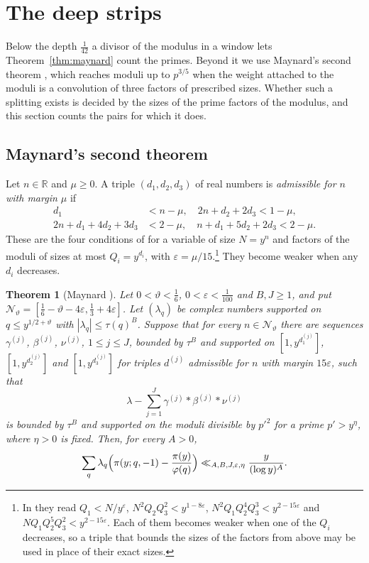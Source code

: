 \documentclass[aps,prd,twocolumn,superscriptaddress,nofootinbib,longbibliography,floatfix,showkeys,nobalancelastpage,amsmath,amssymb,10pt]{revtex4-2}
\theoremstyle{plain}
\newtheorem{theorem}{Theorem}[section]
\theoremstyle{definition}
\theoremstyle{plain}
\newcommand{\eps}{\varepsilon}
\begin{document}
\section{The deep strips}\label{sec:deep}

Below the depth $\frac1{42}$ a divisor of the modulus in a window lets Theorem~\ref{thm:maynard} count the primes. Beyond it we use Maynard's second theorem \cite{May2}, which reaches moduli up to $p^{3/5}$ when the weight attached to the moduli is a convolution of three factors of prescribed sizes. Whether such a splitting exists is decided by the sizes of the prime factors of the modulus, and this section counts the pairs for which it does.

\subsection{Maynard's second theorem}

Let $n\in\mathbb R$ and $\mu\ge0$. A triple $(d_1,d_2,d_3)$ of real numbers is \emph{admissible for $n$ with margin $\mu$} if
\begin{equation}\label{eq:adm}
\begin{split}
d_1&<n-\mu,\quad 2n+d_2+2d_3<1-\mu,\\
2n+d_1+4d_2+3d_3&<2-\mu,\quad n+d_1+5d_2+2d_3<2-\mu.
\end{split}
\end{equation}
These are the four conditions of \cite[Proposition~8.2]{May2} for a variable of size $N=y^n$ and factors of the moduli of sizes at most $Q_i=y^{d_i}$, with $\eps=\mu/15$.\footnote{In \cite{May2} they read $Q_1<N/y^{\eps}$, $N^2Q_2Q_3^2<y^{1-8\eps}$, $N^2Q_1Q_2^4Q_3^3<y^{2-15\eps}$ and $NQ_1Q_2^5Q_3^2<y^{2-15\eps}$. Each of them becomes weaker when one of the $Q_i$ decreases, so a triple that bounds the sizes of the factors from above may be used in place of their exact sizes.} They become weaker when any $d_i$ decreases.

\begin{theorem}[Maynard {\cite{May2}}]\label{thm:maynard2}
Let $0<\vartheta<\frac16$, $0<\eps<\frac1{100}$ and $B,J\ge1$, and put $\mathcal N_\vartheta=[\frac16-\vartheta-4\eps,\frac13+4\eps]$. Let $(\lambda_q)$ be complex numbers supported on $q\le y^{1/2+\vartheta}$ with $|\lambda_q|\le\tau(q)^B$. Suppose that for every $n\in\mathcal N_\vartheta$ there are sequences $\gamma^{(j)}$, $\beta^{(j)}$, $\nu^{(j)}$, $1\le j\le J$, bounded by $\tau^B$ and supported on $[1,y^{d_1^{(j)}}]$, $[1,y^{d_2^{(j)}}]$ and $[1,y^{d_3^{(j)}}]$ for triples $d^{(j)}$ admissible for $n$ with margin $15\eps$, such that
\[
\lambda-\sum_{j=1}^J\gamma^{(j)}*\beta^{(j)}*\nu^{(j)}
\]
is bounded by $\tau^B$ and supported on the moduli divisible by $p'^2$ for a prime $p'>y^\eta$, where $\eta>0$ is fixed.
Then, for every $A>0$,
\[
\sum_q\lambda_q\Bigl(\pi(y;q,-1)-\frac{\pi(y)}{\varphi(q)}\Bigr)\ll_{A,B,J,\eps,\eta}\frac y{(\log y)^A}.
\]
\end{theorem}
\end{document}

